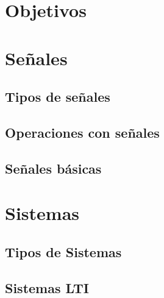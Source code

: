 \documentclass[handout]{beamer}
\begin{document}
  \portada
  \section{Objetivos}
  \section{Señales}
    \subsection{Tipos de señales}
    \subsection{Operaciones con señales}
      
    \subsection{Señales básicas}
  \section{Sistemas}
    \subsection{Tipos de Sistemas}
    \subsection{Sistemas LTI}
\end{document}

